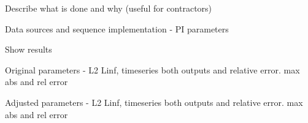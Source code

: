 
Describe what is done and why (useful for contractors)

Data sources and sequence implementation
  - PI parameters

Show results

Original parameters - L2 Linf, timeseries both outputs and relative error. max abs and rel error

Adjusted parameters - L2 Linf, timeseries both outputs and relative error. max abs and rel error

